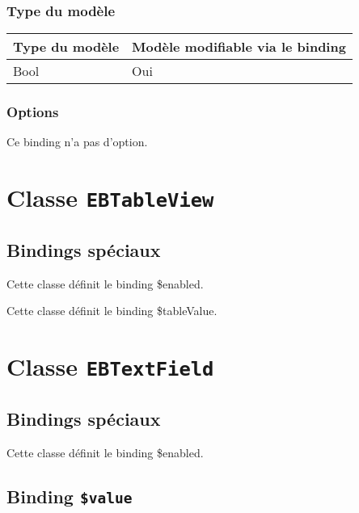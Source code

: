 \subsubsection{Type du modèle}

\begin{tabular}{|l|l|}
\hline
\textbf{Type du modèle} & \textbf{Modèle modifiable via le binding}\\
\hline
Bool & Oui\\
\hline
\end{tabular}
\subsubsection{Options}

Ce binding n'a pas d'option.








\section{Classe \texttt{EBTableView}}

\subsection{Bindings spéciaux}

Cette classe définit le binding \$enabled.

Cette classe définit le binding \$tableValue.








\section{Classe \texttt{EBTextField}}

\subsection{Bindings spéciaux}

Cette classe définit le binding \$enabled.

\subsection{Binding \texttt{\$value}}

